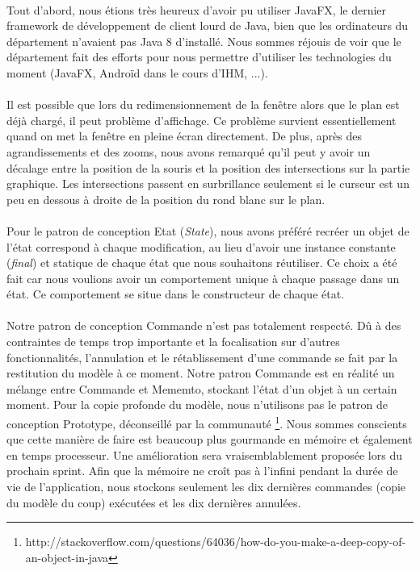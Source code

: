 \documentclass[10pt,a4paper]{book}
\begin{document}
\paragraph{}
Tout d'abord, nous étions très heureux d'avoir pu utiliser JavaFX, le dernier framework de développement de client lourd de Java, bien que les ordinateurs du département n'avaient pas Java 8 d'installé. Nous sommes réjouis de voir que le département fait des efforts pour nous permettre d'utiliser les technologies du moment (JavaFX, Androïd dans le cours d'IHM, ...).
\paragraph{}
Il est possible que lors du redimensionnement de la fenêtre alors que le plan est déjà chargé, il peut problème d'affichage. Ce problème survient essentiellement quand on met la fenêtre en pleine écran directement. De plus, après des agrandissements et des zooms, nous avons remarqué qu'il peut y avoir un décalage entre la position de la souris et la position des intersections sur la partie graphique. Les intersections passent en surbrillance seulement si le curseur est un peu en dessous à droite de la position du rond blanc sur le plan.
\paragraph{}
Pour le patron de conception Etat (\textit{State}), nous avons préféré recréer un objet de l'état correspond à chaque modification, au lieu d'avoir une instance constante (\textit{final}) et statique de chaque état que nous souhaitons réutiliser. Ce choix a été fait car nous voulions avoir un comportement unique à chaque passage dans un état. Ce comportement se situe dans le constructeur de chaque état.
\paragraph{}
Notre patron de conception Commande n'est pas totalement respecté. Dû à des contraintes de temps trop importante et la focalisation sur d'autres fonctionnalités, l'annulation et le rétablissement d'une commande se fait par la restitution du modèle à ce moment. Notre patron Commande est en réalité un mélange entre Commande et Mememto, stockant l'état d'un objet à un certain moment. Pour la copie profonde du modèle, nous n'utilisons pas le patron de conception Prototype, déconseillé par la communauté \footnote{http://stackoverflow.com/questions/64036/how-do-you-make-a-deep-copy-of-an-object-in-java}. Nous sommes conscients que cette manière de faire est beaucoup plus gourmande en mémoire et également en temps processeur. Une amélioration sera vraisemblablement proposée lors du prochain sprint. Afin que la mémoire ne croît pas à l'infini pendant la durée de vie de l'application, nous stockons seulement les dix dernières commandes (copie du modèle du coup) exécutées et les dix dernières annulées.
\end{document}
